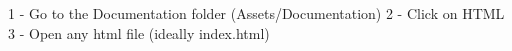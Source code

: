 1 -\/ Go to the Documentation folder (Assets/\+Documentation) 2 -\/ Click on HTML 3 -\/ Open any html file (ideally index.\+html) 